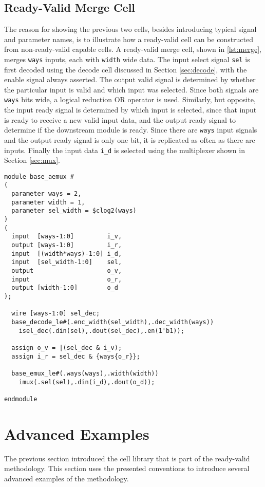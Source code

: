 \subsection{Ready-Valid Merge Cell}
The reason for showing the previous two cells, besides introducing typical signal and parameter names, is to illustrate how a ready-valid cell can be constructed from non-ready-valid capable cells. A ready-valid merge cell, shown in \autoref{lst:merge}, merges \texttt{ways} inputs, each with \texttt{width} wide data. The input select signal \texttt{sel} is first decoded using the decode cell discussed in Section \ref{sec:decode}, with the enable signal always asserted. The output valid signal is determined by whether the particular input is valid and which input was selected. Since both signals are \texttt{ways} bits wide, a logical reduction OR operator is used. Similarly, but opposite, the input ready signal is determined by which input is selected, since that input is ready to receive a new valid input data, and the output ready signal to determine if the downstream module is ready. Since there are \texttt{ways} input signals and the output ready signal is only one bit, it is replicated as often as there are inputs. Finally the input data \texttt{i\_d} is selected using the multiplexer shown in Section \ref{sec:mux}.

\begin{lstlisting}[style={verilog-style}, caption=Ready-valid merge cell from the ready-valid cell library., label=lst:merge]
module base_aemux #
(
  parameter ways = 2,
  parameter width = 1,
  parameter sel_width = $clog2(ways)
)
(
  input  [ways-1:0]         i_v,
  output [ways-1:0]         i_r,
  input  [(width*ways)-1:0] i_d,
  input  [sel_width-1:0]    sel,
  output                    o_v,
  input                     o_r,
  output [width-1:0]        o_d
);

  wire [ways-1:0] sel_dec;
  base_decode_le#(.enc_width(sel_width),.dec_width(ways))
    isel_dec(.din(sel),.dout(sel_dec),.en(1'b1));

  assign o_v = |(sel_dec & i_v);
  assign i_r = sel_dec & {ways{o_r}};

  base_emux_le#(.ways(ways),.width(width))
    imux(.sel(sel),.din(i_d),.dout(o_d));

endmodule
\end{lstlisting}





\section{Advanced Examples}
The previous section introduced the cell library that is part of the ready-valid methodology. This section uses the presented conventions to introduce several advanced examples of the methodology.



